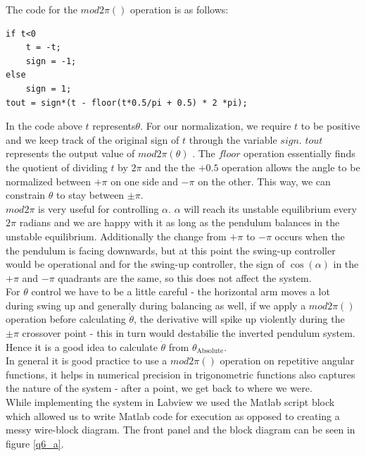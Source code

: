 \documentclass{article}
\theoremstyle{plain}
\theoremstyle{definition}
\theoremstyle{remark}
\begin{document}
The code for the $mod2\pi()$ operation is as follows:

\begin{verbatim}
if t<0
    t = -t;
    sign = -1;
else
    sign = 1;
tout = sign*(t - floor(t*0.5/pi + 0.5) * 2 *pi);
\end{verbatim}

In the code above $t$ represents$\theta$. For our normalization, we require $t$ to be positive and we keep track of the original sign of $t$ through the variable $sign$. $tout$ represents the output value of $mod2\pi(\theta)$ . The $floor$ operation essentially finds the quotient of dividing $t$ by $2\pi$ and the the $+ 0.5$ operation allows the angle to be normalized between $+\pi$ on one side and $-\pi$ on the other. This way, we can constrain $\theta$ to stay between $\pm \pi$.\\

$mod2\pi$ is very useful for controlling $\alpha$. $\alpha$ will reach its unstable equilibrium every $2\pi$ radians and we are happy with it as long as the pendulum balances in the unstable equilibrium. Additionally the change from $+\pi$ to $-\pi$ occurs when the the pendulum is facing downwards, but at this point the swing-up controller would be operational and for the swing-up controller, the sign of $\cos(\alpha)$ in the $+\pi$ and $-\pi$ quadrants are the same, so this does not affect the system.\\

For $\theta$ control we have to be a little careful - the horizontal arm moves a lot during swing up and generally during balancing as well, if we apply a $mod2\pi()$ operation before calculating $\dot{\theta}$, the derivative will spike up violently during the $\pm \pi$ crossover point - this in turn would destabilie the inverted pendulum system. Hence it is a good idea to calculate $\dot{\theta}$ from $\theta_{\text{Absolute}}$.\\

In general it is good practice to use a $mod2\pi()$ operation on repetitive angular functions, it helps in numerical precision in trigonometric functions also captures the nature of the system - after a point, we get back to where we were.\\

While implementing the system in Labview we used the Matlab script block which allowed us to write Matlab code for execution as opposed to creating a messy wire-block diagram. The front panel and the block diagram can be seen in figure \ref{q6_a}.
\end{document}
